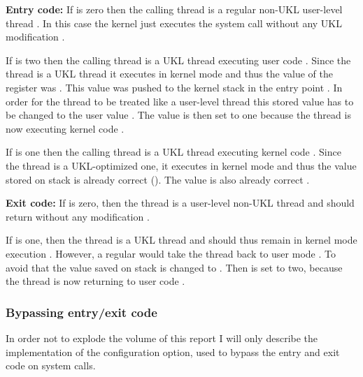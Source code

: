\documentclass[10pt,twocolumn,a4paper]{article}
\begin{document}
      \textbf{Entry code:}
      If  is zero then the calling thread is a regular non-UKL 
      user-level thread \cite{ukl-github-inuser-getter-setter}.
      In this case the kernel just executes the system call without any UKL modification \cite{ukl-github-entry}.

      If  is two then the calling thread is a UKL thread executing 
      user code \cite{ukl-github-inuser-getter-setter}.
      Since the thread is a UKL thread it executes in kernel mode and thus the value of the 
       register was  \cite{raza23}.
      This value was pushed to the kernel stack in the  
      entry point \cite{ukl-github-entry}.
      In order for the thread to be treated like a user-level thread this stored  
      value has to be changed to the user  value \cite{ukl-github-entry}.
      The  value is then set to one because the thread is now executing 
      kernel code \cite{ukl-github-entry, ukl-github-inuser-getter-setter}.

      If  is one then the calling thread is a UKL thread executing 
      kernel code \cite{ukl-github-inuser-getter-setter}.
      Since the thread is a UKL-optimized one, it executes in kernel mode and thus the  value
      stored on stack is already correct ().
      The  value is also already correct \cite{ukl-github-inuser-getter-setter}.

      \textbf{Exit code:}
      If  is zero, then the thread is a user-level non-UKL thread and should return
      without any modification \cite{ukl-github-entry}.

      If  is one, then the thread is a UKL thread and should thus remain in 
      kernel mode execution \cite{ukl-github-entry}.
      However, a regular  would take the thread back to user mode \cite{ukl-github-entry}.
      To avoid that the  value saved on stack is changed to  \cite{ukl-github-entry}.
      Then  is set to two, because the thread is now returning to user 
      code \cite{ukl-github-entry}.

    \subsubsection{Bypassing entry/exit code}
      In order not to explode the volume of this report I will only describe the implementation
      of the  configuration option, used to bypass the entry and exit code
      on system calls.
\end{document}
